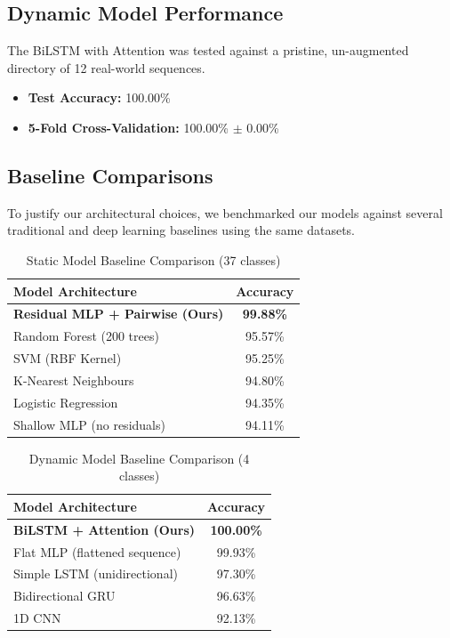 \documentclass[10pt,twocolumn,letterpaper]{article}
\begin{document}
\subsection{Dynamic Model Performance}
The BiLSTM with Attention was tested against a pristine, un-augmented directory of 12 real-world sequences.
\begin{itemize}
    \item \textbf{Test Accuracy:} 100.00\%
    \item \textbf{5-Fold Cross-Validation:} 100.00\% $\pm$ 0.00\%
\end{itemize}

\subsection{Baseline Comparisons}
To justify our architectural choices, we benchmarked our models against several traditional and deep learning baselines using the same datasets.

\begin{table}[h]
\centering
\caption{Static Model Baseline Comparison (37 classes)}
\label{tab:static_baseline}
\begin{tabular}{@{}lc@{}}
\toprule
\textbf{Model Architecture} & \textbf{Accuracy} \\ \midrule
\textbf{Residual MLP + Pairwise (Ours)} & \textbf{99.88\%} \\
Random Forest (200 trees) & 95.57\% \\
SVM (RBF Kernel) & 95.25\% \\
K-Nearest Neighbours & 94.80\% \\
Logistic Regression & 94.35\% \\
Shallow MLP (no residuals) & 94.11\% \\ \bottomrule
\end{tabular}
\end{table}

\begin{table}[h]
\centering
\caption{Dynamic Model Baseline Comparison (4 classes)}
\label{tab:dynamic_baseline}
\begin{tabular}{@{}lc@{}}
\toprule
\textbf{Model Architecture} & \textbf{Accuracy} \\ \midrule
\textbf{BiLSTM + Attention (Ours)} & \textbf{100.00\%} \\
Flat MLP (flattened sequence) & 99.93\% \\
Simple LSTM (unidirectional) & 97.30\% \\
Bidirectional GRU & 96.63\% \\
1D CNN & 92.13\% \\ \bottomrule
\end{tabular}
\end{table}
\end{document}
